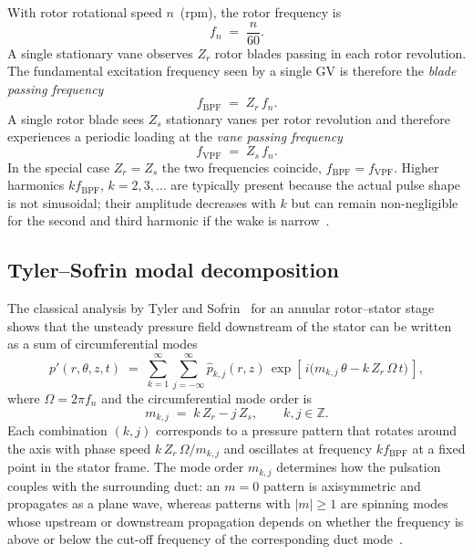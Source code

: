 With rotor rotational speed $n$~(rpm), the rotor frequency
is
\begin{equation}
    f_n \;=\; \frac{n}{60}. \label{eq:fn}
\end{equation}
A single stationary vane observes $Z_r$ rotor blades passing in each
rotor revolution. The fundamental excitation frequency seen by a
single \ac{GV} is therefore the \emph{blade passing
frequency}~\cite{brekke}
\begin{equation}
    f_{\mathrm{BPF}} \;=\; Z_r\, f_n. \label{eq:fbpf}
\end{equation}
A single rotor blade sees $Z_s$ stationary vanes per rotor revolution
and therefore experiences a periodic loading at the \emph{vane
passing frequency}
\begin{equation}
    f_{\mathrm{VPF}} \;=\; Z_s\, f_n. \label{eq:fvpf}
\end{equation}
In the special case $Z_r = Z_s$ the two frequencies coincide,
$f_{\mathrm{BPF}} = f_{\mathrm{VPF}}$. Higher harmonics
$k f_{\mathrm{BPF}}$, $k=2,3,\dots$ are typically present because
the actual pulse shape is not sinusoidal; their amplitude decreases
with $k$ but can remain non-negligible for the second and third
harmonic if the wake is
narrow~\cite{egusquiza2006,rodriguez2007}.

\subsection{Tyler--Sofrin modal decomposition}
\label{sec:rsi-tyler}

The classical analysis by Tyler and Sofrin~\cite{tyler1962} for an
annular rotor--stator stage shows that the unsteady pressure field
downstream of the stator can be written as a sum of circumferential
modes
\begin{equation}
    p'(r,\theta,z,t) \;=\; \sum_{k=1}^{\infty}\sum_{j=-\infty}^{\infty}
      \hat{p}_{k,j}(r,z)\,
      \exp\!\left[\, i\bigl(m_{k,j}\,\theta - k\,Z_r\,\Omega\,t\bigr)\,\right],
    \label{eq:tyler_sofrin_expansion}
\end{equation}
where $\Omega = 2\pi f_n$ and the circumferential mode order is
\begin{equation}
    m_{k,j} \;=\; k\,Z_r - j\,Z_s, \qquad k,j \in \mathbb{Z}.
    \label{eq:tyler_sofrin}
\end{equation}
Each combination $(k,j)$ corresponds to a pressure pattern that
rotates around the axis with phase speed $k\,Z_r\,\Omega/m_{k,j}$ and
oscillates at frequency $k f_{\mathrm{BPF}}$ at a fixed point in the
stator frame. The mode order $m_{k,j}$ determines how the pulsation
couples with the surrounding duct: an $m=0$ pattern is axisymmetric
and propagates as a plane wave, whereas patterns with $|m|\geq 1$
are spinning modes whose upstream or downstream propagation depends
on whether the frequency is above or below the cut-off frequency of
the corresponding duct mode~\cite{morse1968}.

